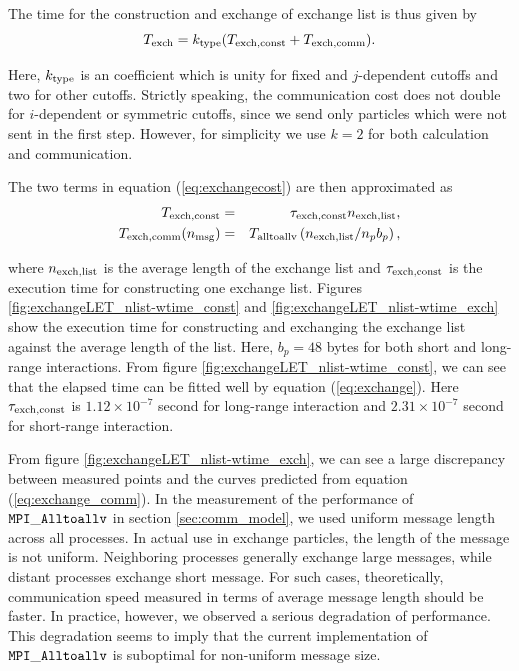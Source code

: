 The time for the construction and exchange of exchange list is thus
given by
\begin{equation}
  T_{\rm exch} = k_{\rm type}(T_{\rm exch,const}+T_{\rm exch,comm}).
  \label{eq:exchangecost}
\end{equation}

Here, $k_{\rm type}$ is an coefficient which is unity for fixed and
$j$-dependent cutoffs and two for other cutoffs. Strictly speaking,
the communication cost does not double for $i$-dependent or symmetric
cutoffs, since we send only particles which were not sent in the first
step. However, for simplicity we use $k=2$ for both calculation and
communication.

The two terms in equation (\ref{eq:exchangecost}) are then
approximated as
\begin{eqnarray}
  T_{\rm exch,const} &=& \tau_{\rm exch,const} n_{\rm exch,list}, \label{eq:exchange} \\
  T_{\rm exch,comm}(n_{\rm msg}) &=&  T_{\rm alltoallv}\left( n_{\rm exch,list}/n_{p} b_p \right), \label{eq:exchange_comm}
\end{eqnarray}

where $n_{\rm exch,list}$ is the average length of the exchange list
and $\tau_{\rm exch,const}$ is the execution time for constructing one
exchange list.  Figures \ref{fig:exchangeLET_nlist-wtime_const}
and \ref{fig:exchangeLET_nlist-wtime_exch} show the execution time for
constructing and exchanging the exchange list against the average
length of the list. Here, $b_p=48$ bytes for both short and long-range
interactions. From figure \ref{fig:exchangeLET_nlist-wtime_const}, we
can see that the elapsed time can be fitted well by equation
(\ref{eq:exchange}).  Here $\tau_{\rm exch,const}$ is $1.12 \times
10^{-7}$ second for long-range interaction and $2.31 \times 10^{-7}$
second for short-range interaction.

From figure \ref{fig:exchangeLET_nlist-wtime_exch}, we can see a large
discrepancy between measured points and the curves predicted from
equation (\ref{eq:exchange_comm}). In the measurement of the
performance of ${\tt MPI\_Alltoallv}$ in section \ref{sec:comm_model},
we used uniform message length across all processes. In actual use in
exchange particles, the length of the message is not
uniform. Neighboring processes generally exchange large messages,
while distant processes exchange short message. For such cases,
theoretically, communication speed measured in terms of average
message length should be faster. In practice, however, we observed a
serious degradation of performance. This degradation seems to imply
that the current implementation of ${\tt MPI\_Alltoallv}$ is
suboptimal for non-uniform message size.

